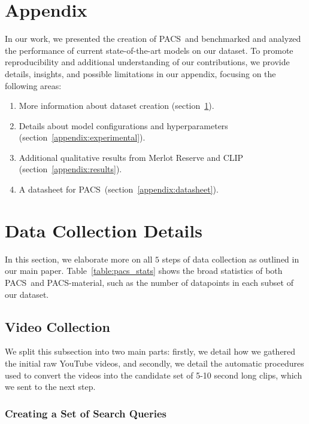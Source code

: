 \documentclass[runningheads]{llncs}
\newcommand{\names}{\textsc{PACS}}
\begin{document}
\clearpage




\clearpage

\section*{Appendix}

\appendix
In our work, we presented the creation of \names\ and benchmarked and analyzed the performance of current state-of-the-art models on our dataset. To promote reproducibility and additional understanding of our contributions, we provide details, insights, and possible limitations in our appendix, focusing on the following areas:
\begin{enumerate}
    \item More information about dataset creation (section~\ref{appendix:data}).
    \item Details about model configurations and hyperparameters (section~\ref{appendix:experimental}).
    \item Additional qualitative results from Merlot Reserve and CLIP (section~\ref{appendix:results}).
    \item A datasheet for \names\ (section~\ref{appendix:datasheet}).
\end{enumerate}


\section{Data Collection Details}
\label{appendix:data}

In this section, we elaborate more on all $5$ steps of data collection as outlined in our main paper. Table~\ref{table:pacs_stats} shows the broad statistics of both \names\ and \names-material, such as the number of datapoints in each subset of our dataset. 

\subsection{Video Collection}
\label{appendix:data1}

We split this subsection into two main parts: firstly, we detail how we gathered the initial raw YouTube videos, and secondly, we detail the automatic procedures used to convert the videos into the candidate set of 5-10 second long clips, which we sent to the next step. 

\subsubsection{Creating a Set of Search Queries}
\end{document}
